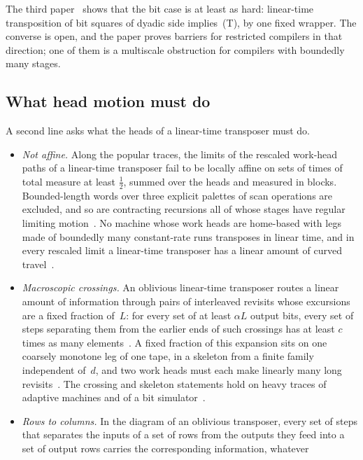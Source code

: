 The third paper~\cite{ThirdPaper2026} shows that the bit case is at least as hard: linear-time transposition of bit
squares of dyadic side implies~(T), by one fixed wrapper. The converse is open, and the paper proves barriers for
restricted compilers in that direction; one of them is a multiscale obstruction for compilers with boundedly many
stages.

\subsection{What head motion must do}\label{sec:motion}

A second line asks what the heads of a linear-time transposer must do.
\begin{itemize}[leftmargin=1.5em]
\item \emph{Not affine.} Along the popular traces, the limits of the rescaled work-head paths of a linear-time
transposer fail to be locally affine on sets of times of total measure at least $\tfrac12$, summed over the heads and
measured in blocks. Bounded-length words over three explicit palettes of scan operations are excluded, and so are
contracting recursions all of whose stages have regular limiting
motion~\cite[Theorems~6.3, 7.1 and~7.5]{SecondPaper2026}. No machine whose work heads are home-based with legs made of
boundedly many constant-rate runs transposes in linear time, and in every rescaled limit a linear-time transposer has
a linear amount of curved travel~\cite[Theorems~3.10 and~3.12]{FourthPaper2026}.
\item \emph{Macroscopic crossings.} An oblivious linear-time transposer routes a linear amount of information through
pairs of interleaved revisits whose excursions are a fixed fraction of~$L$: for every set of at least $\alpha L$ output
bits, every set of steps separating them from the earlier ends of such crossings has at least $c$ times as many
elements~\cite[Theorem~5.5]{SixteenthPaper2026}. A fixed fraction of this expansion sits on one coarsely monotone leg of
one tape, in a skeleton from a finite family independent of~$d$, and two work heads must each make linearly many long
revisits~\cite[Theorems~6.7 and~4.1]{SixteenthPaper2026}. The crossing and skeleton statements hold on heavy traces of
adaptive machines and of a bit simulator~\cite[Theorem~8.1]{SixteenthPaper2026}.
\item \emph{Rows to columns.} In the diagram of an oblivious transposer, every set of steps that separates the inputs
of a set of rows from the outputs they feed into a set of output rows carries the corresponding information, whatever

\end{itemize}
